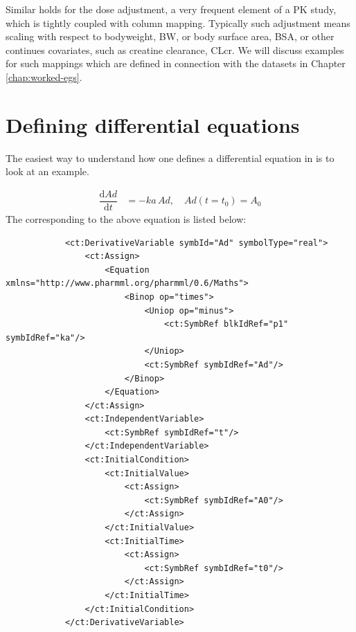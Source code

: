 Similar holds for the dose adjustment, a very frequent element of a PK study, 
which is tightly coupled with column mapping. Typically such adjustment 
means scaling with respect to bodyweight, BW, or body surface area, BSA, 
or other continues covariates, such as creatine clearance, CLcr. We will discuss 
examples for such mappings which are defined in connection with the datasets 
in Chapter \ref{chap:worked-egs}.


\section{Defining differential equations}
\label{sec:odes}

The easiest way to understand how one defines a differential equation in \pharmml
is to look at an example.

\begin{align*}
	\dfrac{\mathrm{d}\mathit{Ad}}{\mathrm{d}t}  &=  -\mathit{ka}\,  \mathit{Ad}, \quad \textit{Ad}(t=t_0)  =  A_0
\end{align*}
%
The corresponding \pharmml to the above equation is listed below:
%
\lstset{language=XML}
\begin{lstlisting}
            <ct:DerivativeVariable symbId="Ad" symbolType="real">
                <ct:Assign>
                    <Equation xmlns="http://www.pharmml.org/pharmml/0.6/Maths">
                        <Binop op="times">
                            <Uniop op="minus">
                                <ct:SymbRef blkIdRef="p1" symbIdRef="ka"/>
                            </Uniop>
                            <ct:SymbRef symbIdRef="Ad"/>
                        </Binop>
                    </Equation>
                </ct:Assign>
                <ct:IndependentVariable>
                    <ct:SymbRef symbIdRef="t"/>
                </ct:IndependentVariable>
                <ct:InitialCondition>
                    <ct:InitialValue>
                        <ct:Assign>
                            <ct:SymbRef symbIdRef="A0"/>
                        </ct:Assign>
                    </ct:InitialValue>
                    <ct:InitialTime>
                        <ct:Assign>
                            <ct:SymbRef symbIdRef="t0"/>
                        </ct:Assign>
                    </ct:InitialTime>
                </ct:InitialCondition>
            </ct:DerivativeVariable>
\end{lstlisting}


